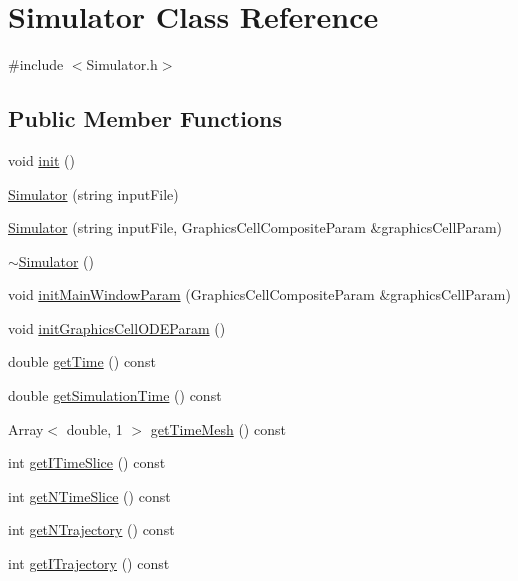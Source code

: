 \hypertarget{class_simulator}{\section{\-Simulator \-Class \-Reference}
\label{class_simulator}
}


{\ttfamily \#include $<$\-Simulator.\-h$>$}

\subsection*{\-Public \-Member \-Functions}
\begin{DoxyCompactItemize}
\item 
void \hyperlink{class_simulator_a630ca1f9cba087798058d6b0d5c8564d}{init} ()
\item 
\hyperlink{class_simulator_a87d9ec0595c4f4953e3e59a1bdbd650a}{\-Simulator} (string input\-File)
\item 
\hyperlink{class_simulator_a7bc3104a9e0a2ea81f49f5dd2be6d7a7}{\-Simulator} (string input\-File, \-Graphics\-Cell\-Composite\-Param \&graphics\-Cell\-Param)
\item 
\hyperlink{class_simulator_a0f49aa04f42060a785adf77346b9de9f}{$\sim$\-Simulator} ()
\item 
void \hyperlink{class_simulator_a086254d2ac4f05260295cf6d39b39118}{init\-Main\-Window\-Param} (\-Graphics\-Cell\-Composite\-Param \&graphics\-Cell\-Param)
\item 
void \hyperlink{class_simulator_a050a8284ace34c39f271302d3fee80d3}{init\-Graphics\-Cell\-O\-D\-E\-Param} ()
\item 
double \hyperlink{class_simulator_a52361b7628b32d91da4ba369306f40e9}{get\-Time} () const 
\item 
double \hyperlink{class_simulator_a1d8fc1bc934ee5f41895d5ba4037002d}{get\-Simulation\-Time} () const 
\item 
\-Array$<$ double, 1 $>$ \hyperlink{class_simulator_ab26592212e1d456bd976f544e714fd13}{get\-Time\-Mesh} () const 
\item 
int \hyperlink{class_simulator_a3292a9420792a1267bd8ea6063931919}{get\-I\-Time\-Slice} () const 
\item 
int \hyperlink{class_simulator_a43e1b0569b932bf353b77f70daf95fbe}{get\-N\-Time\-Slice} () const 
\item 
int \hyperlink{class_simulator_a0ec57d427d83931c107009024fd09985}{get\-N\-Trajectory} () const 
\item 
int \hyperlink{class_simulator_ae9171c45b06669041e56a9278da1419f}{get\-I\-Trajectory} () const 

\end{DoxyCompactItemize}
